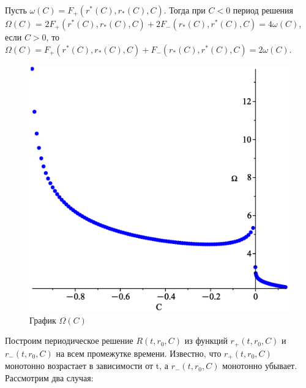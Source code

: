 \documentclass{article}
\begin{document}
Пусть $\omega(C) = F_+(r^*(C),r_*(C), C)$. Тогда при $C < 0$ период решения $\Omega(C)$ = $ 2F_+(r^*(C),r_*(C), C) + 2F_-(r_*(C), r^*(C), C) = 4\omega(C)$,\\ если $C > 0$, то $\Omega(C) = F_+(r^*(C),r_*(C), C) + F_-(r_*(C), r^*(C), C) = 2\omega(C)$.
\begin{figure}[ht!]
\begin{center}
\includegraphics[scale=0.45]{omega.eps}
\caption{График $\Omega(C)$}
\end{center}
\end{figure}
\newpage
Построим периодическое решение $R(t,r_0, C)$ из функций $r_+(t, r_0, C)$ и $r_-(t,r_0, C)$ на всем промежутке времени. Известно, что $r_+(t,r_0, C)$ монотонно возрастает в зависимости от t, а $r_-(t,r_0,C)$ монотонно убывает. Рассмотрим два случая:
\end{document}

